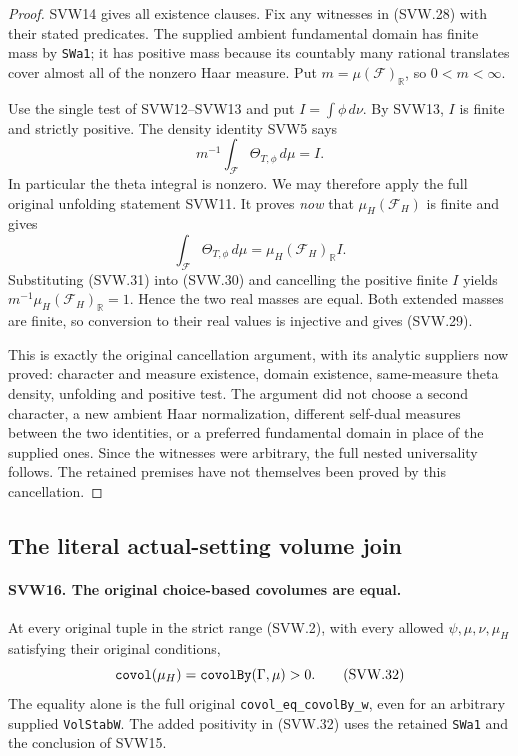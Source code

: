 \documentclass[11pt,a4paper]{article}
\numberwithin{equation}{section}
\theoremstyle{remark}\newtheorem{remark}[theorem]{Remark}
\begin{document}
\begin{proof}
SVW14 gives all existence clauses.  Fix any witnesses in (SVW.28)
with their stated predicates.  The supplied ambient fundamental
domain has finite mass by \texttt{SWa1}; it has positive mass
because its countably many rational translates cover almost all
of the nonzero Haar measure.  Put $m=\mu(\mathcal F)_{\mathbb R}$,
so $0<m<\infty$.

Use the single test of SVW12--SVW13 and put
$I=\int\phi\,d\nu$.  By SVW13, $I$ is finite and strictly
positive.  The density identity SVW5 says
\[
                    m^{-1}\int_{\mathcal F}\Theta_{T,\phi}\,d\mu=I.
 \tag{SVW.30}
\]
In particular the theta integral is nonzero.  We may therefore
apply the full original unfolding statement SVW11.  It proves
\emph{now} that $\mu_H(\mathcal F_H)$ is finite and gives
\[
 \int_{\mathcal F}\Theta_{T,\phi}\,d\mu
                        =\mu_H(\mathcal F_H)_{\mathbb R}I.
 \tag{SVW.31}
\]
Substituting (SVW.31) into (SVW.30) and cancelling the positive
finite $I$ yields
$m^{-1}\mu_H(\mathcal F_H)_{\mathbb R}=1$.  Hence the two real
masses are equal.  Both extended masses are finite, so conversion
to their real values is injective and gives (SVW.29).

This is exactly the original cancellation argument, with its
analytic suppliers now proved: character and measure existence,
domain existence, same-measure theta density, unfolding and
positive test.  The argument did not choose a second character,
a new ambient Haar normalization, different self-dual measures
between the two identities, or a preferred fundamental domain
in place of the supplied ones.  Since the witnesses were arbitrary,
the full nested universality follows.  The retained premises have
not themselves been proved by this cancellation.
\end{proof}

\subsection{The literal actual-setting volume join}

\paragraph{SVW16. The original choice-based covolumes are equal.}
\label{claim:SVW16}
At every original tuple in the strict range (SVW.2), with every
allowed $\psi,\mu,\nu,\mu_H$ satisfying their original conditions,
\[
       \texttt{covol}(\mu_H)
           =\texttt{covol\allowbreak By}(\Gamma,\mu)>0.
 \tag{SVW.32}
\]
The equality alone is the full original
\texttt{covol\_\allowbreak eq\_\allowbreak covol\allowbreak By\_\allowbreak w}, even for an arbitrary supplied
\texttt{Vol\allowbreak Stab\allowbreak W}.  The added positivity in (SVW.32) uses the
retained \texttt{SWa1} and the conclusion of SVW15.
\end{document}
